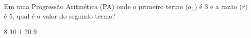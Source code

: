 Em uma Progressão Aritmética (PA) onde o primeiro termo ($a_1$) é 3 e a razão ($r$) é 5, qual é o valor do segundo termo?

8
10
1
20
9





